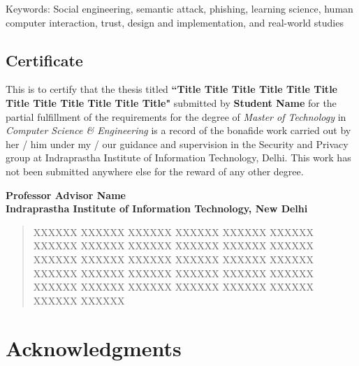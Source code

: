 \documentclass[letterpaper,11pt]{report}
\begin{document}


\newpage

\pagestyle{empty}
\vspace*{7.1in} 
Keywords: Social engineering, semantic attack, phishing, learning science, human computer interaction, trust, design and implementation, and real-world studies 

\newpage

\begin{center}
\section*{Certificate}\label{section:certificate}
\end{center}

This is to certify that the thesis titled \textbf{``Title Title Title Title Title Title Title Title Title Title Title Title"} submitted by \textbf{Student Name} for the partial fulfillment of the requirements for the degree of \emph{Master of Technology} in \emph{Computer Science \& Engineering} is a record of the bonafide work carried out by her / him under my / our guidance and supervision in the Security and Privacy group at Indraprastha Institute of Information Technology, Delhi. This work has not been submitted anywhere else for the reward of any other degree. \\ \vspace{0.5in}

\textbf{Professor Advisor Name}\\
\textbf{Indraprastha Institute of Information Technology, New Delhi}

\begin{abstract}

XXXXXX XXXXXX XXXXXX XXXXXX XXXXXX XXXXXX XXXXXX XXXXXX XXXXXX XXXXXX XXXXXX XXXXXX XXXXXX XXXXXX XXXXXX XXXXXX XXXXXX XXXXXX XXXXXX XXXXXX XXXXXX XXXXXX XXXXXX XXXXXX XXXXXX XXXXXX XXXXXX XXXXXX XXXXXX XXXXXX XXXXXX XXXXXX  

\end{abstract}

\newpage
\pagestyle{empty}


\newpage



\section*{Acknowledgments}\label{section:acknowledgments}
\pagestyle{plain}
\end{document}

